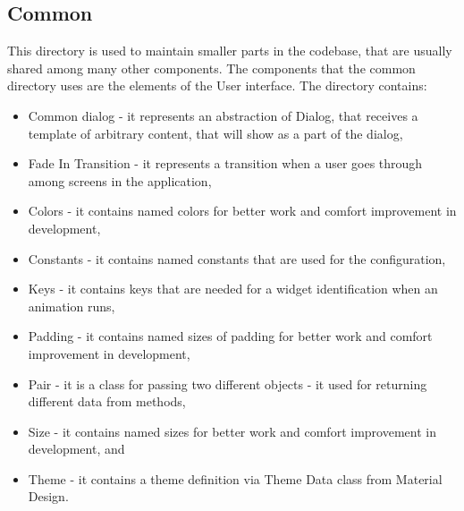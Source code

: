 \subsection{Common}\label{subsec:common}
This directory is used to maintain smaller parts in the codebase, that are usually shared among many other components.
The components that the common directory uses are the elements of the User interface.
The directory contains:
\begin{itemize}
    \item Common dialog - it represents an abstraction of Dialog, that receives a template of arbitrary content, that will show as a part of the dialog,
    \item Fade In Transition - it represents a transition when a user goes through among screens in the application,
    \item Colors - it contains named colors for better work and comfort improvement in development,
    \item Constants - it contains named constants that are used for the configuration,
    \item Keys - it contains keys that are needed for a widget identification when an animation runs,
    \item Padding - it contains named sizes of padding for better work and comfort improvement in development,
    \item Pair - it is a class for passing two different objects - it used for returning different data from methods,
    \item Size - it contains named sizes for better work and comfort improvement in development, and
    \item Theme - it contains a theme definition via Theme Data class from Material Design.
\end{itemize}
